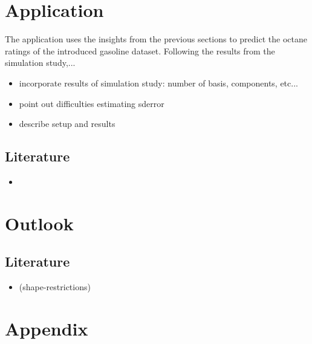 \documentclass[11pt,twoside,a4paper]{article}
\begin{document}
	\section{Application}
		The application uses the insights from the previous sections to predict the octane ratings of the introduced gasoline dataset. Following the results from the simulation study,... 
		\begin{itemize}
			\item {\color{green} incorporate results of simulation study: number of basis, components, etc...}
			\item point out difficulties estimating sderror
			\item describe setup and results
\end{itemize}
	
	\subsection{Literature}
	\begin{itemize}
		\item \cite{carey_life_2002}
	\end{itemize}

	\section{Outlook}
	
	\subsection{Literature}
	\begin{itemize}
		\item \cite{James.2009} (shape-restrictions)
	\end{itemize}
	
	\newpage
	\section{Appendix}
	
\end{document}
